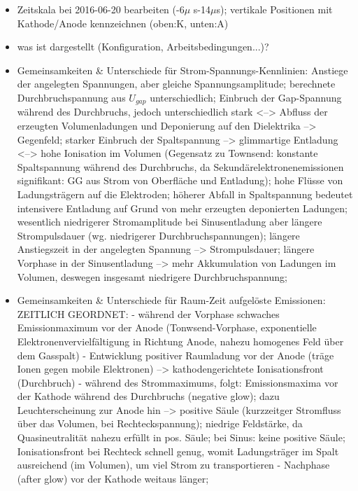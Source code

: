 \documentclass[a4paper,10pt]{article}
\begin{document}
		\begin{itemize}
			\item Zeitskala bei 2016-06-20 bearbeiten (-6$\mu$ s-14$\mu$s); vertikale Positionen mit Kathode/Anode kennzeichnen (oben:K, unten:A)
			\item was ist dargestellt (Konfiguration, Arbeitsbedingungen...)?
			\item Gemeinsamkeiten \& Unterschiede für Strom-Spannungs-Kennlinien: Anstiege der angelegten Spannungen, aber gleiche Spannungsamplitude; berechnete Durchbruchspannung aus $U_{gap}$ unterschiedlich; Einbruch der Gap-Spannung während des Durchbruchs, jedoch unterschiedlich stark <--> Abfluss der erzeugten Volumenladungen und Deponierung auf den Dielektrika --> Gegenfeld; starker Einbruch der Spaltspannung --> glimmartige Entladung <--> hohe Ionisation im Volumen (Gegensatz zu Townsend: konstante Spaltspannung während des Durchbruchs, da Sekundärelektronenemissionen signifikant: GG aus Strom von Oberfläche und Entladung); hohe Flüsse von Ladungsträgern auf die Elektroden; höherer Abfall in Spaltspannung bedeutet intensivere Entladung auf Grund von mehr erzeugten deponierten Ladungen; wesentlich niedrigerer Stromamplitude bei Sinusentladung aber längere Strompulsdauer (wg. niedrigerer Durchbruchspannungen); längere Anstiegszeit in der angelegten Spannung --> Strompulsdauer; längere Vorphase in der Sinusentladung --> mehr Akkumulation von Ladungen im Volumen, deswegen insgesamt niedrigere Durchbruchspannung; 
			\item Gemeinsamkeiten \& Unterschiede für Raum-Zeit aufgelöste Emissionen:
					ZEITLICH GEORDNET:	- während der Vorphase schwaches Emissionmaximum vor der Anode (Tonwsend-Vorphase, exponentielle Elektronenvervielfältigung in Richtung Anode, nahezu homogenes Feld über dem Gasspalt)
															- Entwicklung positiver Raumladung vor der Anode (träge Ionen gegen mobile Elektronen) --> kathodengerichtete Ionisationsfront (Durchbruch) 
															- während des Strommaximums, folgt: Emissionsmaxima vor der Kathode während des Durchbruchs (negative glow); dazu Leuchterscheinung zur Anode hin --> positive Säule (kurzzeitger Stromfluss über das Volumen, bei Rechteckspannung); niedrige Feldstärke, da Quasineutralität nahezu erfüllt in pos. Säule;  bei Sinus: keine positive Säule; Ionisationsfront bei Rechteck schnell genug, womit Ladungsträger im Spalt ausreichend (im Volumen), um viel Strom zu transportieren 
															- Nachphase (after glow) vor der Kathode weitaus länger;  
		\end{itemize}
		
\end{document}
